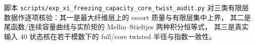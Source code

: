 \begin{remark}[有限层审计接口]\label{rem:xi-time-part57b-freezing-capacity-core-twist-audit}
脚本 \texttt{scripts/exp\_xi\_freezing\_capacity\_core\_twist\_audit.py}
对三类有限层数据作逐项核验：其一是最大纤维层上的 escort 质量与有限层集中上界，
其二是尾函数/连续容量曲线与实阶矩的 Mellin--Stieltjes 两种积分恒等式，
其三是真实输入 \(40\) 状态核在若干模数下的 full/core twisted 半径与指数一致性。
\end{remark}

\endinput
